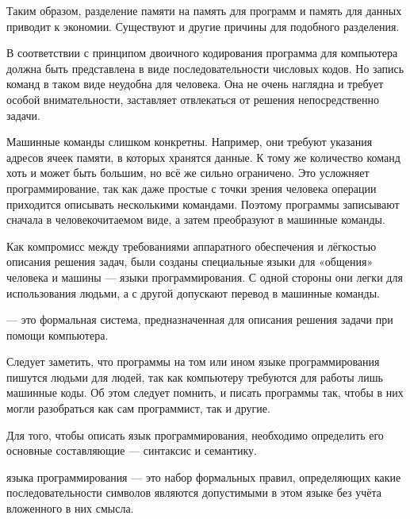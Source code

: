 Таким образом, разделение памяти на память для программ и память для
данных приводит к экономии. Существуют и другие причины для подобного
разделения.


В соответствии с принципом двоичного кодирования программа для
компьютера должна быть представлена в виде последовательности числовых
кодов. Но запись команд в таком виде неудобна для человека. Она не
очень наглядна и требует особой внимательности, заставляет отвлекаться
от решения непосредственно задачи.

Машинные команды слишком конкретны. Например, они требуют указания
адресов ячеек памяти, в которых хранятся данные. К тому же количество
команд хоть и может быть большим, но всё же сильно ограничено. Это
усложняет программирование, так как даже простые с точки зрения
человека операции приходится описывать несколькими командами. Поэтому
программы записывают сначала в человекочитаемом виде, а затем
преобразуют в машинные команды.

Как компромисс между требованиями аппаратного обеспечения и лёгкостью
описания решения задач, были созданы специальные языки для «общения»
человека и машины — языки программирования. С одной стороны они легки
для использования людьми, а с другой допускают перевод в машинные
команды.

\begin{defn}
   — это формальная
  система, предназначенная для описания решения задачи при помощи
  компьютера.
\end{defn}

Следует заметить, что программы на том или ином языке программирования
пишутся людьми для людей, так как компьютеру требуются для работы лишь
машинные коды. Об этом следует помнить, и писать программы так, чтобы
в них могли разобраться как сам программист, так и другие.


Для того, чтобы описать язык программирования, необходимо определить
его основные составляющие — синтаксис и семантику.

\begin{defn}
   языка программирования — это набор
  формальных правил, определяющих какие последовательности символов
  являются допустимыми в этом языке без учёта вложенного в них смысла.
\end{defn}

